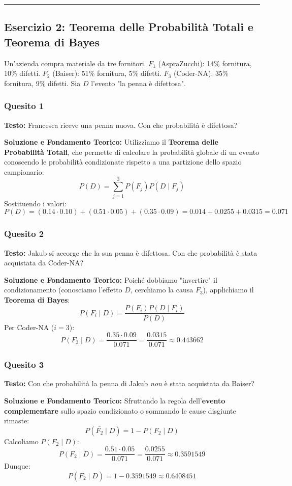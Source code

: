 \documentclass[12pt, a4paper]{article}
\begin{document}
\vspace{0.5cm}\hrule\vspace{0.5cm}

\subsection*{Esercizio 2: Teorema delle Probabilità Totali e Teorema di Bayes}
Un'azienda compra materiale da tre fornitori.
$F_1$ (AspraZucchi): 14\% fornitura, 10\% difetti.
$F_2$ (Baiser): 51\% fornitura, 5\% difetti.
$F_3$ (Coder-NA): 35\% fornitura, 9\% difetti.
Sia $D$ l'evento "la penna è difettosa".

\subsubsection*{Quesito 1}
\textbf{Testo:} Francesca riceve una penna nuova. Con che probabilità è difettosa?

\textbf{Soluzione e Fondamento Teorico:} 
Utilizziamo il \textbf{Teorema delle Probabilità Totali}, che permette di calcolare la probabilità globale di un evento conoscendo le probabilità condizionate rispetto a una partizione dello spazio campionario:
$$ P(D) = \sum_{j=1}^{3} P(F_j)P(D \mid F_j) $$
Sostituendo i valori:
$$ P(D) = (0.14 \cdot 0.10) + (0.51 \cdot 0.05) + (0.35 \cdot 0.09) = 0.014 + 0.0255 + 0.0315 = 0.071 $$

\subsubsection*{Quesito 2}
\textbf{Testo:} Jakub si accorge che la sua penna è difettosa. Con che probabilità è stata acquistata da Coder-NA?

\textbf{Soluzione e Fondamento Teorico:} 
Poiché dobbiamo "invertire" il condizionamento (conosciamo l'effetto $D$, cerchiamo la causa $F_3$), applichiamo il \textbf{Teorema di Bayes}:
$$ P(F_i \mid D) = \frac{P(F_i)P(D \mid F_i)}{P(D)} $$
Per Coder-NA ($i=3$):
$$ P(F_3 \mid D) = \frac{0.35 \cdot 0.09}{0.071} = \frac{0.0315}{0.071} \approx 0.443662 $$

\subsubsection*{Quesito 3}
\textbf{Testo:} Con che probabilità la penna di Jakub \textit{non} è stata acquistata da Baiser?

\textbf{Soluzione e Fondamento Teorico:} 
Sfruttando la regola dell'\textbf{evento complementare} sullo spazio condizionato o sommando le cause disgiunte rimaste:
$$ P(\bar{F_2} \mid D) = 1 - P(F_2 \mid D) $$
Calcoliamo $P(F_2 \mid D)$:
$$ P(F_2 \mid D) = \frac{0.51 \cdot 0.05}{0.071} = \frac{0.0255}{0.071} \approx 0.3591549 $$
Dunque:
$$ P(\bar{F_2} \mid D) = 1 - 0.3591549 \approx 0.6408451 $$
\end{document}
